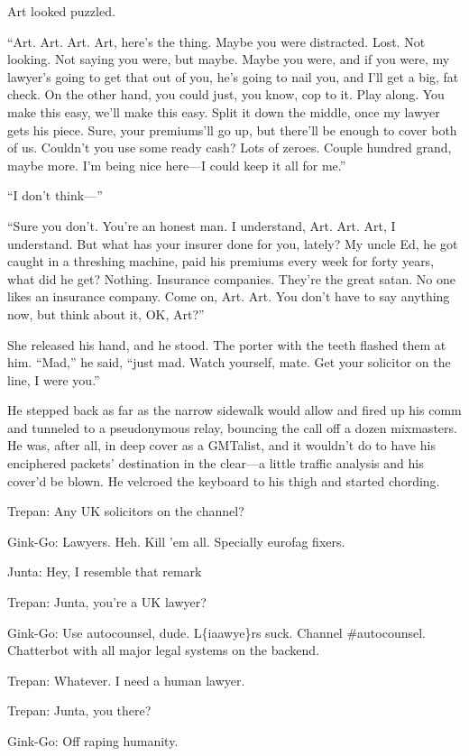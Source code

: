Art looked puzzled.

“Art. Art. Art. Art, here’s the thing. Maybe you were distracted.
Lost. Not looking. Not saying you were, but maybe. Maybe you were,
and if you were, my lawyer’s going to get that out of you, he’s
going to nail you, and I’ll get a big, fat check. On the other
hand, you could just, you know, cop to it. Play along. You make
this easy, we’ll make this easy. Split it down the middle, once my
lawyer gets his piece. Sure, your premiums’ll go up, but there’ll
be enough to cover both of us. Couldn’t you use some ready cash?
Lots of zeroes. Couple hundred grand, maybe more. I’m being nice
here—I could keep it all for me.”

“I don’t think—”

“Sure you don’t. You’re an honest man. I understand, Art. Art. Art,
I understand. But what has your insurer done for you, lately? My
uncle Ed, he got caught in a threshing machine, paid his premiums
every week for forty years, what did he get? Nothing. Insurance
companies. They’re the great satan. No one likes an insurance
company. Come on, Art. Art. You don’t have to say anything now, but
think about it, OK, Art?”

She released his hand, and he stood. The porter with the teeth
flashed them at him. “Mad,” he said, “just mad. Watch yourself,
mate. Get your solicitor on the line, I were you.”

He stepped back as far as the narrow sidewalk would allow and fired
up his comm and tunneled to a pseudonymous relay, bouncing the call
off a dozen mixmasters. He was, after all, in deep cover as a
GMTalist, and it wouldn’t do to have his enciphered packets’
destination in the clear—a little traffic analysis and his cover’d
be blown. He velcroed the keyboard to his thigh and started
chording.

Trepan: Any UK solicitors on the channel?

Gink-Go: Lawyers. Heh. Kill 'em all. Specially eurofag fixers.

Junta: Hey, I resemble that remark

Trepan: Junta, you're a UK lawyer?

Gink-Go: Use autocounsel, dude. L\{ia\textbar{}awye\}rs suck.
Channel \#autocounsel. Chatterbot with all major legal systems on
the backend.

Trepan: Whatever. I need a human lawyer.

Trepan: Junta, you there?

Gink-Go: Off raping humanity.

